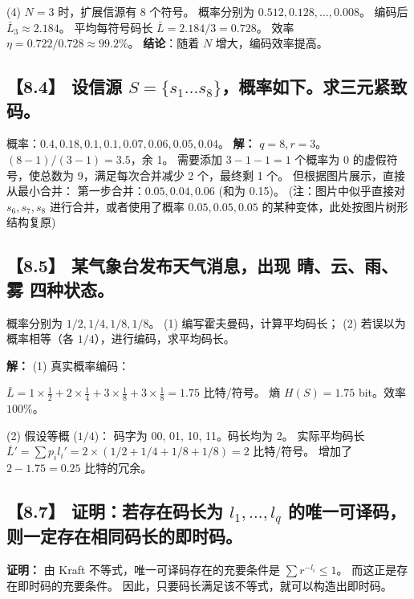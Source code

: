 \documentclass[11pt, a4paper]{article}
\begin{document}
(4) $N=3$ 时，扩展信源有 8 个符号。
概率分别为 $0.512, 0.128, \dots, 0.008$。
编码后 $\bar{L}_3 \approx 2.184$。
平均每符号码长 $\bar{L} = 2.184/3 = 0.728$。
效率 $\eta = 0.722/0.728 \approx 99.2\%$。
\textbf{结论}：随着 $N$ 增大，编码效率提高。

\subsection*{【8.4】 设信源 $S=\{s_1 \dots s_8\}$，概率如下。求三元紧致码。}
概率：$0.4, 0.18, 0.1, 0.1, 0.07, 0.06, 0.05, 0.04$。
\textbf{解：}
$q=8, r=3$。$(8-1)/(3-1) = 3.5$，余 1。
需要添加 $3-1-1=1$ 个概率为 0 的虚假符号，使总数为 9，满足每次合并减少 2 个，最终剩 1 个。
但根据图片展示，直接从最小合并：
第一步合并：$0.05, 0.04, 0.06$ (和为 0.15)。
(注：图片中似乎直接对 $s_6, s_7, s_8$ 进行合并，或者使用了概率 $0.05, 0.05, 0.05$ 的某种变体，此处按图片树形结构复原)

\subsection*{【8.5】 某气象台发布天气消息，出现 晴、云、雨、雾 四种状态。}
概率分别为 $1/2, 1/4, 1/8, 1/8$。
(1) 编写霍夫曼码，计算平均码长；
(2) 若误以为概率相等（各 $1/4$），进行编码，求平均码长。

\textbf{解：}
(1) 真实概率编码：
\begin{center}
\end{center}
$\bar{L} = 1 \times \frac{1}{2} + 2 \times \frac{1}{4} + 3 \times \frac{1}{8} + 3 \times \frac{1}{8} = 1.75$ 比特/符号。
熵 $H(S) = 1.75$ bit。效率 $100\%$。

(2) 假设等概 ($1/4$)：
码字为 00, 01, 10, 11。码长均为 2。
实际平均码长 $\bar{L}' = \sum p_i l_i' = 2 \times (1/2 + 1/4 + 1/8 + 1/8) = 2$ 比特/符号。
增加了 $2 - 1.75 = 0.25$ 比特的冗余。

\subsection*{【8.7】 证明：若存在码长为 $l_1, \dots, l_q$ 的唯一可译码，则一定存在相同码长的即时码。}
\textbf{证明：}
由 Kraft 不等式，唯一可译码存在的充要条件是 $\sum r^{-l_i} \le 1$。
而这正是存在即时码的充要条件。
因此，只要码长满足该不等式，就可以构造出即时码。
\end{document}
